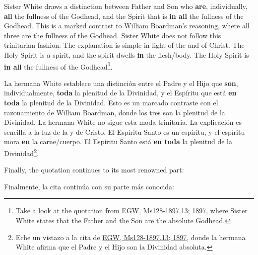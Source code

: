 Sister White draws a distinction between Father and Son who \textbf{are}, individually, \textbf{all} the fullness of the Godhead, and the Spirit that is \textbf{in all} the fullness of the Godhead. This is a marked contrast to William Boardman’s reasoning, where all three are the fullness of the Godhead. Sister White does not follow this trinitarian fashion. The explanation is simple in light of the  and of Christ. The Holy Spirit is a spirit, and the spirit dwells \textbf{in} the flesh/body. The Holy Spirit is \textbf{in all} the fullness of the Godhead\footnote{Take a look at the quotation from \href{https://egwwritings.org/?ref=en_Ms128-1897.13&para=5426.19}{{EGW, Ms128-1897.13; 1897}}, where Sister White states that the Father and the Son are the absolute Godhead.}.


La hermana White establece una distinción entre el Padre y el Hijo que \textbf{son}, individualmente, \textbf{toda} la plenitud de la Divinidad, y el Espíritu que está \textbf{en toda} la plenitud de la Divinidad. Esto es un marcado contraste con el razonamiento de William Boardman, donde los tres son la plenitud de la Divinidad. La hermana White no sigue esta moda trinitaria. La explicación es sencilla a la luz de la  y de Cristo. El Espíritu Santo es un espíritu, y el espíritu mora \textbf{en} la carne/cuerpo. El Espíritu Santo está \textbf{en toda} la plenitud de la Divinidad\footnote{Eche un vistazo a la cita de \href{https://egwwritings.org/?ref=en_Ms128-1897.13&para=5426.19}{{EGW, Ms128-1897.13; 1897}}, donde la hermana White afirma que el Padre y el Hijo son la Divinidad absoluta.}.


Finally, the quotation continues to its most renowned part:


Finalmente, la cita continúa con su parte más conocida:


